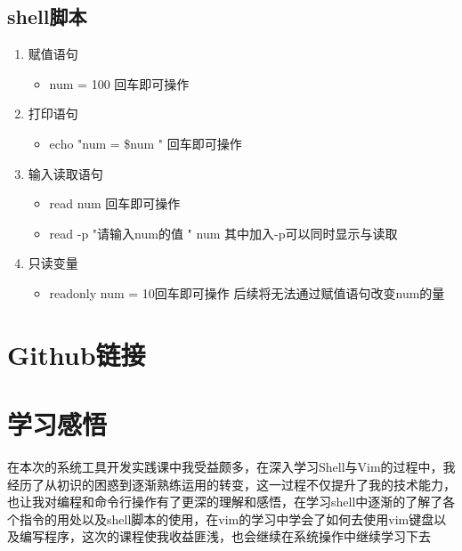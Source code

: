 \documentclass[a4paper, 12pt]{article}
\begin{document}
\subsection{shell脚本}
\begin{enumerate}
\item{\large 赋值语句}
    \begin{itemize}
        \item num = 100 回车即可操作
    \end{itemize}
\item{\large 打印语句}
    \begin{itemize}
        \item echo "num = \$num " 回车即可操作
    \end{itemize}
\item{\large 输入读取语句}
    \begin{itemize}
        \item read num 回车即可操作
        \item read -p "请输入num的值 " num 其中加入-p可以同时显示与读取
    \end{itemize}
\item{\large 只读变量}
    \begin{itemize}
        \item readonly num = 10回车即可操作 后续将无法通过赋值语句改变num的量
    \end{itemize}
\end{enumerate}
\section{Github链接}


\section{学习感悟}
    在本次的系统工具开发实践课中我受益颇多，在深入学习Shell与Vim的过程中，我经历了从初识的困惑到逐渐熟练运用的转变，这一过程不仅提升了我的技术能力，也让我对编程和命令行操作有了更深的理解和感悟，在学习shell中逐渐的了解了各个指令的用处以及shell脚本的使用，在vim的学习中学会了如何去使用vim键盘以及编写程序，这次的课程使我收益匪浅，也会继续在系统操作中继续学习下去
\end{document}
